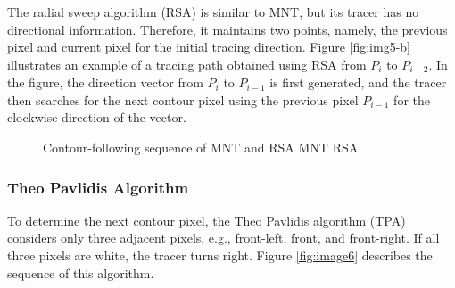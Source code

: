 The radial sweep algorithm (RSA)\cite{Mirante1982Radial} is similar to MNT, but its tracer has no directional information. Therefore, it maintains two points, namely, the previous pixel and current pixel for the initial tracing direction. Figure \ref{fig:img5-b} illustrates an example of a tracing path obtained using RSA from $P_i$ to $P_{i+2}$. In the figure, the direction vector from $P_i$ to $P_{i-1}$ is first generated, and the tracer then searches for the next contour pixel using the previous pixel $P_{i-1}$ for the clockwise direction of the vector.

\begin{figure}[htbp]
	\centering
	\caption{Contour-following sequence of MNT and RSA \protect{} MNT \cite{Toussaint????Grids} \protect{} RSA\cite{Mirante1982Radial}}
	\label{fig:mnt_rsa}
\end{figure}

\subsubsection{Theo Pavlidis Algorithm}
To determine the next contour pixel, the Theo Pavlidis algorithm (TPA) \cite{Pavlidis2012Algorithms} considers only three adjacent pixels, e.g., front-left, front, and front-right. If all three pixels are white, the tracer turns right. Figure \ref{fig:image6} describes the sequence of this algorithm. 

